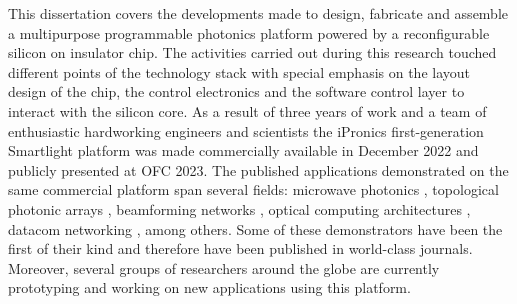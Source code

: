 This dissertation covers the developments made to design, fabricate and assemble a multipurpose programmable photonics platform powered by a reconfigurable silicon on insulator chip.
The activities carried out during this research touched different points of the technology stack with special emphasis on the layout design of the chip, the control electronics and the software control layer to interact with the silicon core.
As a result of three years of work and a team of enthusiastic hardworking engineers and scientists the iPronics first-generation Smartlight platform was made commercially available in December 2022 and publicly presented at OFC 2023.
The published applications demonstrated on the same commercial platform span several fields: microwave photonics \cite{perez_multipurpose_2017, perez-lopez_general-purpose_2024,catala-lahoz_self-configuring_2023}, topological photonic arrays \cite{on_programmable_2024,hashemi_non-hermitian_2024}, beamforming networks \cite{perez-lopez_programmable_2018}, optical computing architectures \cite{ashtiani_photonic_2023,ashtiani_universal_2024,ashtiani_programmable_2024}, datacom networking \cite{xie_software-defined_2024}, among others.
Some of these demonstrators have been the first of their kind and therefore have been published in world-class journals.
Moreover, several groups of researchers around the globe are currently prototyping and working on new applications using this platform.

